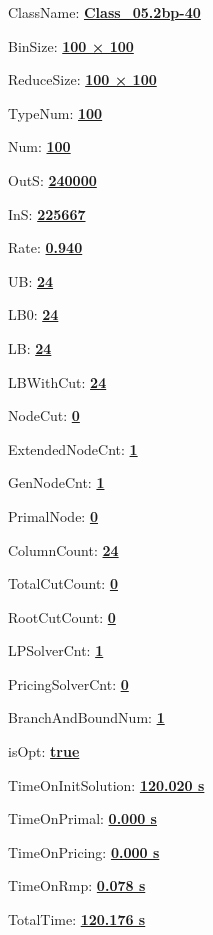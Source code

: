 \documentclass[11pt]{article}
\begin{document}
\pagestyle{empty}


ClassName: \underline{\textbf{Class_05.2bp-40}}
\par
BinSize: \underline{\textbf{100 × 100}}
\par
ReduceSize: \underline{\textbf{100 × 100}}
\par
TypeNum: \underline{\textbf{100}}
\par
Num: \underline{\textbf{100}}
\par
OutS: \underline{\textbf{240000}}
\par
InS: \underline{\textbf{225667}}
\par
Rate: \underline{\textbf{0.940}}
\par
UB: \underline{\textbf{24}}
\par
LB0: \underline{\textbf{24}}
\par
LB: \underline{\textbf{24}}
\par
LBWithCut: \underline{\textbf{24}}
\par
NodeCut: \underline{\textbf{0}}
\par
ExtendedNodeCnt: \underline{\textbf{1}}
\par
GenNodeCnt: \underline{\textbf{1}}
\par
PrimalNode: \underline{\textbf{0}}
\par
ColumnCount: \underline{\textbf{24}}
\par
TotalCutCount: \underline{\textbf{0}}
\par
RootCutCount: \underline{\textbf{0}}
\par
LPSolverCnt: \underline{\textbf{1}}
\par
PricingSolverCnt: \underline{\textbf{0}}
\par
BranchAndBoundNum: \underline{\textbf{1}}
\par
isOpt: \underline{\textbf{true}}
\par
TimeOnInitSolution: \underline{\textbf{120.020 s}}
\par
TimeOnPrimal: \underline{\textbf{0.000 s}}
\par
TimeOnPricing: \underline{\textbf{0.000 s}}
\par
TimeOnRmp: \underline{\textbf{0.078 s}}
\par
TotalTime: \underline{\textbf{120.176 s}}
\par
\newpage


\end{document}
